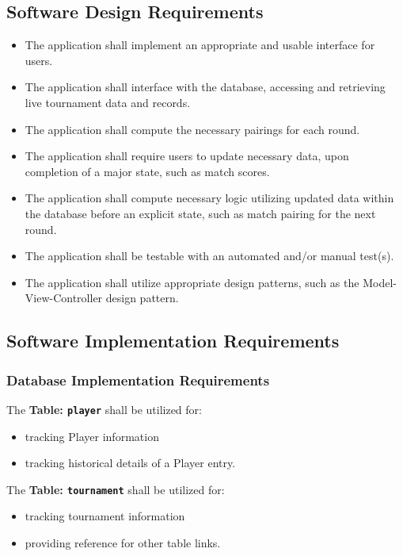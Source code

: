 \documentclass[11pt]{article}
\begin{document}
    \subsection{Software Design Requirements}
    \begin{itemize}
        \item The application shall implement an appropriate and usable interface for users.
        \item The application shall interface with the database, accessing and retrieving live tournament data and records.
        \item The application shall compute the necessary pairings for each round.
        \item The application shall require users to update necessary data, upon completion of a major state, such as match scores.
        \item The application shall compute necessary logic utilizing updated data within the database before an explicit state, such as match pairing for the next round.
        \item The application shall be testable with an automated and/or manual test(s).
        \item The application shall utilize appropriate design patterns, such as the Model-View-Controller design pattern.
    \end{itemize}

    \newpage

    \subsection{Software Implementation Requirements}
        \subsubsection{Database Implementation Requirements}
            The \textbf{Table: \texttt{player}} shall be utilized for:
            \begin{itemize}
                \item tracking Player information
                \item tracking historical details of a Player entry.
            \end{itemize}

            The \textbf{Table: \texttt{tournament}} shall be utilized for:
            \begin{itemize}
                \item tracking tournament information
                \item providing reference for other table links.
            \end{itemize}
\end{document}
